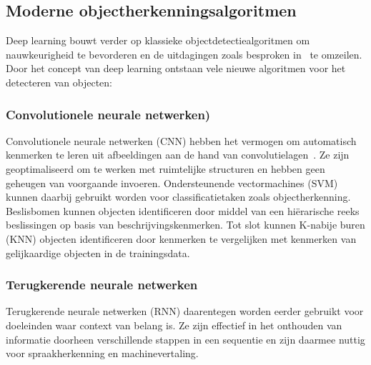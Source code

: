 \subsection{Moderne objectherkenningsalgoritmen}
\label{subsec:deep-learning-in-objectherkenning}
Deep learning bouwt verder op klassieke objectdetectiealgoritmen om nauwkeurigheid te bevorderen en de uitdagingen zoals besproken in~ te omzeilen.
Door het concept van deep learning ontstaan vele nieuwe algoritmen voor het detecteren van objecten:

\subsubsection{Convolutionele neurale netwerken)}
Convolutionele neurale netwerken (CNN) hebben het vermogen om automatisch kenmerken te leren uit afbeeldingen aan de hand van convolutielagen~\autocite{Nourmohammadi2024}.
Ze zijn geoptimaliseerd om te werken met ruimtelijke structuren en hebben geen geheugen van voorgaande invoeren.
Ondersteunende vectormachines (SVM) kunnen daarbij gebruikt worden voor classificatietaken zoals objectherkenning.
Beslisbomen kunnen objecten identificeren door middel van een hi\"erarische reeks beslissingen op basis van beschrijvingskenmerken.
Tot slot kunnen K-nabije buren (KNN) objecten identificeren door kenmerken te vergelijken met kenmerken van gelijkaardige objecten in de trainingsdata.

\subsubsection{Terugkerende neurale netwerken}
Terugkerende neurale netwerken (RNN) daarentegen worden eerder gebruikt voor doeleinden waar context van belang is.
Ze zijn effectief in het onthouden van informatie doorheen verschillende stappen in een sequentie en zijn daarmee nuttig voor spraakherkenning en machinevertaling.



